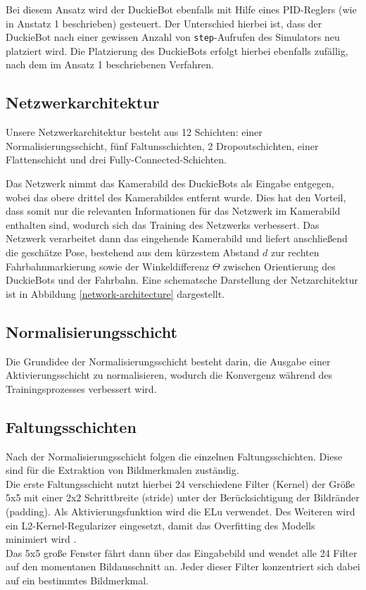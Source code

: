 Bei diesem Ansatz wird der DuckieBot ebenfalls mit Hilfe eines PID-Reglers (wie in Anstatz 1 beschrieben) gesteuert. Der Unterschied hierbei ist, dass der DuckieBot nach einer gewissen Anzahl von \texttt{step}-Aufrufen des Simulators neu platziert wird. Die Platzierung des DuckieBots erfolgt hierbei ebenfalls zufällig, nach dem im Ansatz 1 beschriebenen Verfahren. 

\subsection{Netzwerkarchitektur}

Unsere Netzwerkarchitektur besteht aus 12 Schichten: einer Normalisierungsschicht, fünf Faltunsschichten, 2 Dropoutschichten, einer Flattenschicht und drei Fully-Connected-Schichten.

Das Netzwerk nimmt das  Kamerabild des DuckieBots als Eingabe entgegen, wobei das obere drittel des Kamerabildes entfernt wurde. Dies hat den Vorteil, dass somit nur die relevanten Informationen für das Netzwerk im Kamerabild enthalten sind, wodurch sich das Training des Netzwerks verbessert. Das Netzwerk verarbeitet dann das eingehende Kamerabild und liefert anschließend die geschätze Pose, bestehend aus dem kürzestem Abstand $d$ zur rechten Fahrbahnmarkierung sowie der Winkeldifferenz $\Theta$ zwischen Orientierung des DuckieBots und der Fahrbahn. Eine schematsche Darstellung der Netzarchitektur ist in Abbildung \ref{network-architecture} dargestellt. \\

\subsection{Normalisierungsschicht}
Die Grundidee der Normalisierungsschicht besteht darin, die Ausgabe einer Aktivierungsschicht zu normalisieren, wodurch die Konvergenz während des Trainingsprozesses verbessert wird. \cite{tensorflow} \\

\subsection{Faltungsschichten}
Nach der Normalisierungsschicht folgen die einzelnen Faltungsschichten. Diese sind für die Extraktion von Bildmerkmalen zuständig. \\

Die erste Faltungsschicht nutzt hierbei 24 verschiedene Filter (Kernel) der Größe 5x5 mit einer 2x2 Schrittbreite (stride) unter der Berücksichtigung der Bildränder (padding). Als Aktivierungsfunktion wird die ELu verwendet. Des Weiteren wird ein L2-Kernel-Regularizer eingesetzt, damit das Overfitting des Modells minimiert wird \cite{tensorflow2}.  \\ 
Das 5x5 große Fenster fährt dann über das Eingabebild und wendet alle 24 Filter auf den momentanen Bildausschnitt an. Jeder dieser Filter konzentriert sich dabei auf ein bestimmtes Bildmerkmal. \\

